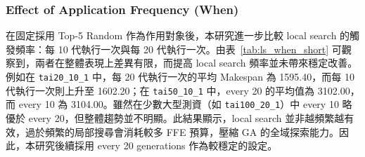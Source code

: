 \documentclass[conference]{IEEEtran}
\begin{document}
\begin{table}[htbp]
\caption{Local Search選擇不同目標時之平均與最小 Makespan}
\label{tab:ls_who_short}
\centering
{}
\end{table}


\subsubsection{Effect of Application Frequency (When)}
在固定採用 Top-5 Random 作為作用對象後，本研究進一步比較 local search 的觸發頻率：每 10 代執行一次與每 20 代執行一次。由表~\ref{tab:ls_when_short} 可觀察到，兩者在整體表現上差異有限，而提高 local search 頻率並未帶來穩定改善。例如在 \texttt{tai20\_10\_1} 中，每 20 代執行一次的平均 Makespan 為 1595.40，而每 10 代執行一次則上升至 1602.20；在 \texttt{tai50\_10\_1} 中，every 20 的平均值為 3102.00，而 every 10 為 3104.00。雖然在少數大型測資（如 \texttt{tai100\_20\_1}）中 every 10 略優於 every 20，但整體趨勢並不明顯。此結果顯示，local search 並非越頻繁越有效，過於頻繁的局部搜尋會消耗較多 FFE 預算，壓縮 GA 的全域探索能力。因此，本研究後續採用 every 20 generations 作為較穩定的設定。
\end{document}
